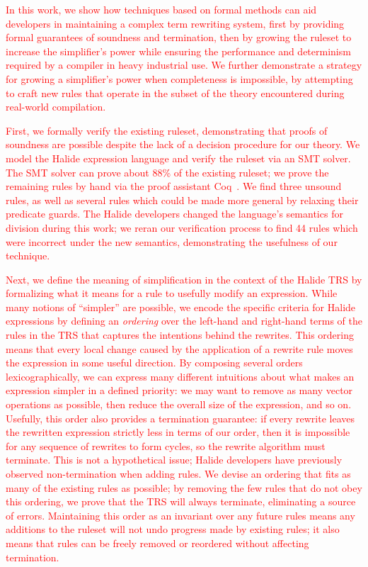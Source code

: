 \documentclass[acmsmall,review]{acmart}\settopmatter{printfolios=true,printccs=false,printacmref=false}
\newcommand{\modified}[1]{\textcolor{red}{{#1}}}
\begin{document}
\modified{ In this work, we show how techniques based on formal methods can aid developers in
 maintaining a complex term rewriting system, first by providing formal guarantees 
 of soundness and termination, then by growing the ruleset to increase the simplifier's 
 power while ensuring the performance and determinism required by a compiler in heavy
 industrial use.  We further demonstrate a strategy for growing a simplifier's power
 when completeness is impossible, by attempting to craft new rules that operate in
 the subset of the theory encountered during real-world compilation.}

\modified{First, we formally verify the existing 
ruleset, demonstrating that proofs of soundness are possible despite the lack of a 
decision procedure for our theory. We model the Halide expression language and verify 
the ruleset via an SMT solver. The SMT solver can prove about 88\% of the existing ruleset;
we prove the remaining rules by hand via the proof assistant Coq~\cite{Coq19}. We find three unsound rules, 
as well as several rules which could be made more general by relaxing their predicate guards. 
The Halide developers changed the language's semantics for division during this work; we reran our verification 
process to find 44 rules which were incorrect under the new semantics, demonstrating 
the usefulness of our technique.}

\modified{Next, we define the meaning of simplification in the context of the Halide TRS
by formalizing what it means for a rule to usefully modify an expression.  While
many notions of ``simpler'' are possible, we encode the specific criteria for Halide
expressions by defining an \emph{ordering} over the left-hand and right-hand terms of 
the rules in the TRS that captures the intentions behind the rewrites. This ordering 
means that every local change caused by the application of a rewrite rule moves the 
expression in some useful direction. By composing several orders lexicographically, 
we can express many different intuitions about what makes an expression simpler in a
defined priority: we may want to remove as many vector operations as possible, 
then reduce the overall size of the expression, and so on. Usefully, this order also provides a termination guarantee: 
if every rewrite leaves the rewritten expression strictly less in terms of our order, 
then it is impossible for any sequence of rewrites to form cycles, so the rewrite 
algorithm must terminate. This is not a hypothetical issue; Halide developers have previously
observed non-termination when adding rules.  We devise an ordering that fits as many of the existing rules as 
possible; by removing the few rules that do not obey this ordering, we prove 
that the TRS will always terminate, eliminating a source of errors. Maintaining this order as 
an invariant over any future rules means any additions to the ruleset will not undo 
progress made by existing rules; it also means that rules can be freely removed or reordered 
without affecting termination.}
\end{document}
